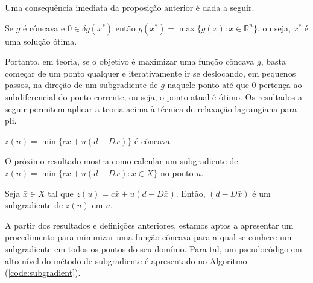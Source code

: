 Uma consequência imediata da proposição anterior é dada a seguir.

\begin{proposition}\label{proposition:optimal}
Se $g$ é côncava e $0 \in  \delta g(x^*)$ então $g(x^*) = \max\{g(x) :
x \in \mathbb{R}^n\}$, ou seja, $x^*$ é uma solução ótima.
\end{proposition}

Portanto, em teoria, se o objetivo é maximizar uma função côncava $g$,
basta começar de um ponto  qualquer e iterativamente ir se deslocando,
em pequenos passos, na direção de um subgradiente de $g$ naquele ponto
até que $0$  pertença ao subdiferencial do ponto corrente,  ou seja, o
ponto atual é ótimo. Os resultados  a seguir permitem aplicar a teoria
acima à técnica de relaxação lagrangiana para \gls{pli}.

\begin{proposition} \label{proposition-zu-convex}
$z(u) = \min \{cx + u (d - Dx)\}$ é côncava.
\end{proposition}

O próximo  resultado mostra como  calcular um subgradiente de  $z(u) =
\min \{cx + u (d - Dx) : x \in X\}$ no ponto $u$.

\begin{proposition}
Seja  $\bar{x}   \in  X$  tal   que  $z(u)  =   c  \bar{x}  +   u(d  -
D\bar{x})$. Então,  $(d -  D\bar{x})$ é um  subgradiente de  $z(u)$ em
$u$.
\end{proposition}

A  partir dos  resultados  e definições  anteriores,  estamos aptos  a
apresentar um  procedimento para minimizar  uma função côncava  para a
qual se  conhece um subgradiente  em todos  os pontos do  seu domínio.
Para tal,  um pseudocódigo em alto  nível do método de  subgradiente é
apresentado no Algoritmo (\ref{code:subgradient}).

